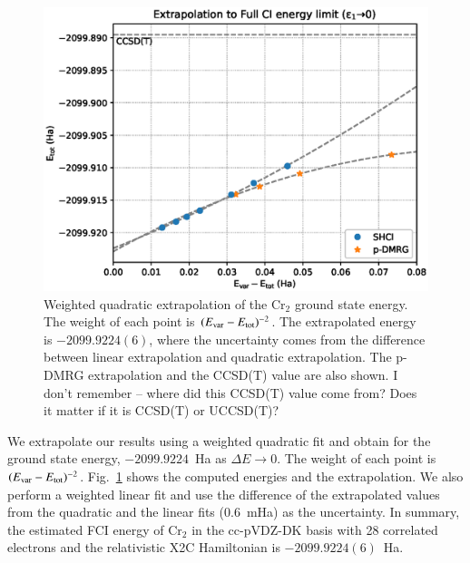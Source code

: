 \begin{figure}
  \includegraphics[width=\linewidth]{figs/extrapolate.eps}
  \caption{Weighted quadratic extrapolation of the Cr$_2$ ground state energy.
  The weight of each point is $(E_{\rm var} - E_{\rm tot})^{-2}$.
  The extrapolated energy is $-2099.9224(6)$, where the uncertainty comes from the difference between linear extrapolation and quadratic extrapolation.
  The p-DMRG extrapolation and the CCSD(T) value are also shown.
  {\color{red} I don't remember -- where did this CCSD(T) value come from?  Does it matter if it is CCSD(T) or UCCSD(T)?}
}
  \label{fig:extrapolation}
\end{figure}

We extrapolate our results using a weighted quadratic fit
and obtain for the ground state energy, $-2099.9224$~Ha as $\Delta E\to0$.
The weight of each point is $(E_{\rm var} - E_{\rm tot})^{-2}$.
Fig.~\ref{fig:extrapolation} shows the computed energies and the extrapolation.
We also perform a weighted linear fit and use the difference of the extrapolated values from the quadratic and the linear fits (0.6~mHa) as the uncertainty.
In summary, the estimated FCI energy of Cr$_2$ in the cc-pVDZ-DK basis with 28 correlated electrons and the relativistic X2C Hamiltonian
is $-2099.9224(6)$~Ha.

